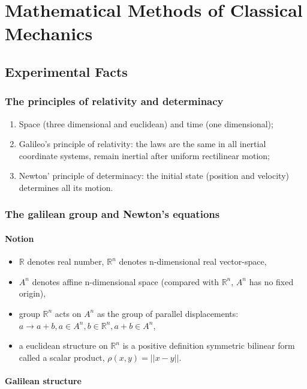 \section{Mathematical Methods of Classical Mechanics}

\subsection{Experimental Facts}

\subsubsection{The principles of relativity and determinacy}

\begin{enumerate}[label=(\roman*)]
  \item Space (three dimensional and euclidean) and time (one dimensional);
  \item Galileo's principle of relativity: the laws are the same in all inertial coordinate systems, remain inertial after uniform rectilinear motion;
  \item Newton' principle of determinacy: the initial state (position and velocity) determines all its motion.
\end{enumerate}

\subsubsection{The galilean group and Newton's equations}

\paragraph{Notion} 
\begin{itemize}
  \renewcommand{\labelitemi}{$\dagger$}
  \item $\mathds{R}$ denotes real number, $\mathds{R}^n$ denotes n-dimensional real vector-space,
  \item $A^n$ denotes affine n-dimensional space (compared with $\mathds{R}^n$, $A^n$ has no fixed origin),
  \item group $\mathds{R}^n$ acts on $A^n$ as the group of parallel displacements: $a \rightarrow a + b, a \in A^n, b \in \mathds{R}^n, a + b \in A^n$,
  \item a euclidean structure on $\mathds{R}^n$ is a positive definition symmetric bilinear form called a scalar product, $\rho(x, y)=||x - y||$.
\end{itemize}

\paragraph{Galilean structure}